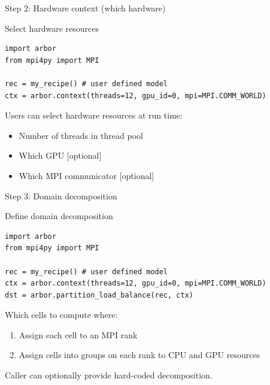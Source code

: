 \documentclass[aspectratio=43]{beamer}
\begin{document}
\begin{frame}[fragile]{Step 2: Hardware context (which hardware)}

    \vspace{-20pt}

    \begin{code}{Select hardware resources}
        \begin{lstlisting}[style=talkpython]
import arbor
from mpi4py import MPI

rec = my_recipe() # user defined model
ctx = arbor.context(threads=12, gpu_id=0, mpi=MPI.COMM_WORLD)
        \end{lstlisting}
    \end{code}

\vfill

    Users can select hardware resources at run time:
    \begin{itemize}
        \item Number of threads in thread pool
        \item Which GPU [optional]
        \item Which MPI communicator [optional]
    \end{itemize}
\end{frame}

\begin{frame}[fragile]{Step 3: Domain decomposition}
    \begin{code}{Define domain decomposition}
        \begin{lstlisting}[style=talkpython]
import arbor
from mpi4py import MPI

rec = my_recipe() # user defined model
ctx = arbor.context(threads=12, gpu_id=0, mpi=MPI.COMM_WORLD)
dst = arbor.partition_load_balance(rec, ctx)
        \end{lstlisting}
    \end{code}

    Which cells to compute where:
    \begin{enumerate}
        \item Assign each cell to an MPI rank
        \item Assign cells into groups on each rank to CPU and GPU resources
    \end{enumerate}

    \vspace{10pt}

    Caller can optionally provide hard-coded decomposition.

    \vfill
\end{frame}
\end{document}
